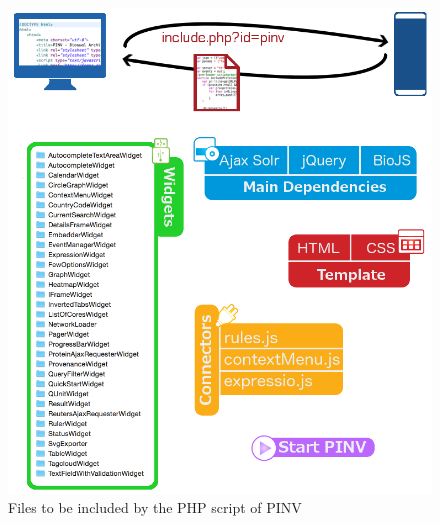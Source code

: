 \begin{figure}
\centering
\includegraphics[width=\textwidth]{figures/include_php.png}
\caption[Files to be included by the PHP script of PINV]{Files to be included by the PHP script of PINV
\label{fig:pinv_include}}
\end{figure}

